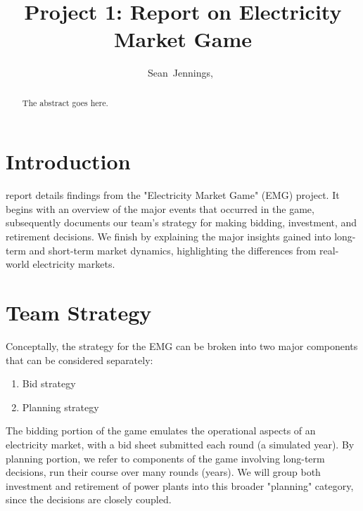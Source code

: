 \documentclass[journal,11pt]{IEEEtran}
\begin{document}
\title{Project 1: Report on Electricity Market Game}

\author{Sean~Jennings,~}


\maketitle

\begin{abstract}
The abstract goes here.
\end{abstract}



\section{Introduction}
 report details findings from the "Electricity Market Game" (EMG) project.
It begins with an overview of the major events that occurred in the game, 
subsequently documents our team's strategy for making bidding, investment, and retirement decisions.
We finish by explaining the major insights gained into long-term and short-term market dynamics,
highlighting the differences from real-world electricity markets.

\section{Team Strategy}

Conceptally, the strategy for the EMG can be broken into two major components that can be considered
separately:
\begin{enumerate}
  \item Bid strategy
  \item Planning strategy
\end{enumerate}

The bidding portion of the game emulates the operational aspects of an electricity market, with
a bid sheet submitted each round (a simulated year). By planning portion, we refer to components of the game
involving long-term decisions, run their course over many rounds (years). We will group both investment
and retirement of power plants into this broader "planning" category, since the decisions are closely
coupled.
\end{document}
